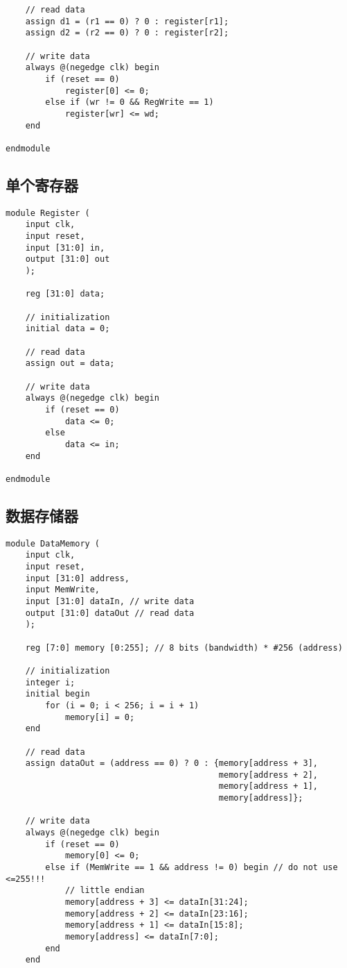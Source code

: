 \begin{multicols}{2}
\begin{lstlisting}
    // read data
    assign d1 = (r1 == 0) ? 0 : register[r1];
    assign d2 = (r2 == 0) ? 0 : register[r2];

    // write data
    always @(negedge clk) begin
        if (reset == 0)
            register[0] <= 0;
        else if (wr != 0 && RegWrite == 1)
            register[wr] <= wd;
    end

endmodule
\end{lstlisting}

\subsection{单个寄存器}
\begin{lstlisting}
module Register (
    input clk,
    input reset,
    input [31:0] in,
    output [31:0] out
    );
    
    reg [31:0] data;

    // initialization
    initial data = 0;

    // read data
    assign out = data;

    // write data
    always @(negedge clk) begin
        if (reset == 0)
            data <= 0;
        else
            data <= in;
    end

endmodule
\end{lstlisting}

\subsection{数据存储器}
\begin{lstlisting}
module DataMemory (
    input clk,
    input reset,
    input [31:0] address,
    input MemWrite,
    input [31:0] dataIn, // write data
    output [31:0] dataOut // read data
    );
    
    reg [7:0] memory [0:255]; // 8 bits (bandwidth) * #256 (address)

    // initialization
    integer i;
    initial begin
        for (i = 0; i < 256; i = i + 1)
            memory[i] = 0;
    end

    // read data
    assign dataOut = (address == 0) ? 0 : {memory[address + 3],
                                           memory[address + 2],
                                           memory[address + 1],
                                           memory[address]};

    // write data
    always @(negedge clk) begin
        if (reset == 0)
            memory[0] <= 0;
        else if (MemWrite == 1 && address != 0) begin // do not use <=255!!!
            // little endian
            memory[address + 3] <= dataIn[31:24];
            memory[address + 2] <= dataIn[23:16];
            memory[address + 1] <= dataIn[15:8];
            memory[address] <= dataIn[7:0];
        end
    end


\end{lstlisting}
\end{multicols}
